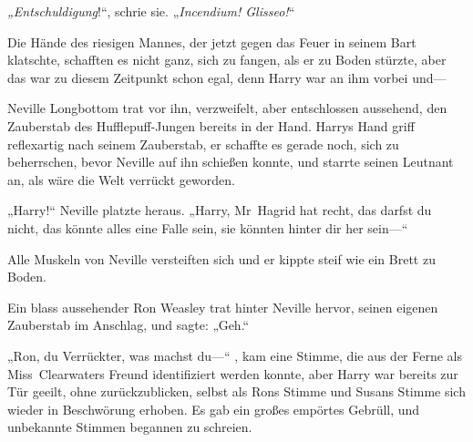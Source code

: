 \emph{„Entschuldigung}!“, schrie sie. „\emph{Incendium! Glisseo!}“

Die Hände des riesigen Mannes, der jetzt gegen das Feuer in seinem Bart klatschte, schafften es nicht ganz, sich zu fangen, als er zu Boden stürzte, aber das war zu diesem Zeitpunkt schon egal, denn Harry war an ihm vorbei und—


Neville Longbottom trat vor ihn, verzweifelt, aber entschlossen aussehend, den Zauberstab des Hufflepuff-Jungen bereits in der Hand. Harrys Hand griff reflexartig nach seinem Zauberstab, er schaffte es gerade noch, sich zu beherrschen, bevor Neville auf ihn schießen konnte, und starrte seinen Leutnant an, als wäre die Welt verrückt geworden.

„Harry!“ Neville platzte heraus. „Harry, Mr~Hagrid hat recht, das darfst du nicht, das könnte alles eine Falle sein, sie könnten hinter dir her sein—“

Alle Muskeln von Neville versteiften sich und er kippte steif wie ein Brett zu Boden.

Ein blass aussehender Ron Weasley trat hinter Neville hervor, seinen eigenen Zauberstab im Anschlag, und sagte: „Geh.“

„Ron, du Verrückter, was machst du—“ , kam eine Stimme, die aus der Ferne als Miss~Clearwaters Freund identifiziert werden konnte, aber Harry war bereits zur Tür geeilt, ohne zurückzublicken, selbst als Rons Stimme und Susans Stimme sich wieder in Beschwörung erhoben. Es gab ein großes empörtes Gebrüll, und unbekannte Stimmen begannen zu schreien.

